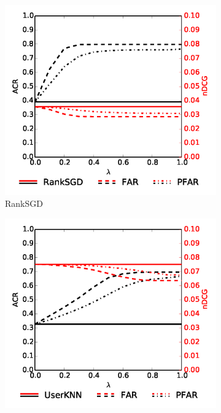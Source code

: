\begin{figure}[!htb]
	\centering
	\begin{subfigure}{0.49\columnwidth} %
		\includegraphics[width=\textwidth]{imgs/far/ranksgd.png}
		\caption{RankSGD \cite{pmlr-v18-jahrer12b}} %
	\end{subfigure}
	\begin{subfigure}{0.49\columnwidth} %
		\includegraphics[width=\textwidth]{imgs/far/userknn.png}

\end{subfigure}
\end{figure}
